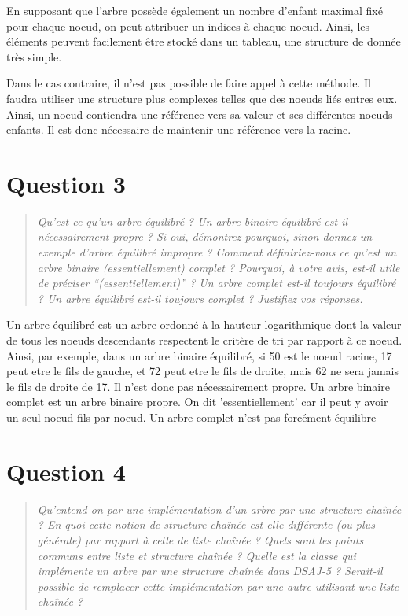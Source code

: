 \documentclass[11pt,a4paper]{article}
\begin{document}
En supposant que l'arbre possède également un nombre d'enfant maximal fixé pour chaque noeud, on peut
attribuer un indices à chaque noeud. Ainsi, les éléments peuvent facilement être stocké dans un tableau,
une structure de donnée très simple.

Dans le cas contraire, il n'est pas possible de faire appel à cette méthode. Il faudra utiliser une structure
plus complexes telles que des noeuds liés entres eux. Ainsi, un noeud contiendra une référence vers sa valeur
et ses différentes noeuds enfants. Il est donc nécessaire de maintenir une référence vers la racine.

\section{Question 3}
\begin{quotation}
\color{gray}\textit{Qu’est-ce qu’un arbre équilibré ? Un arbre binaire équilibré est-il nécessairement
propre ? Si oui, démontrez pourquoi, sinon donnez un exemple d’arbre équilibré
impropre ? Comment définiriez-vous ce qu’est un arbre binaire (essentiellement)
complet ? Pourquoi, à votre avis, est-il utile de préciser “(essentiellement)” ? Un
arbre complet est-il toujours équilibré ? Un arbre équilibré est-il toujours complet ? Justifiez vos réponses.}
\end{quotation}

Un arbre équilibré est un arbre ordonné à la hauteur logarithmique dont la valeur de tous les noeuds descendants respectent le critère
de tri par rapport à ce noeud. Ainsi, par exemple, dans un arbre binaire équilibré,
si 50 est le noeud racine, 17 peut etre le fils de gauche, et 72 peut etre le fils de droite, mais 62 ne sera
jamais le fils de droite de 17. Il n'est donc pas nécessairement propre.
Un arbre binaire complet est un arbre binaire propre. On dit 'essentiellement' car il peut y avoir un seul noeud fils par noeud.
Un arbre complet n'est pas forcément équilibre

\section{Question 4}
\begin{quotation}
\color{gray}\textit{Qu’entend-on par une implémentation d’un arbre par une structure chaînée ? En
quoi cette notion de structure chaînée est-elle différente (ou plus générale) par
rapport à celle de liste chaînée ? Quels sont les points communs entre liste et
structure chaînée ? Quelle est la classe qui implémente un arbre par une structure
chaînée dans DSAJ-5 ? Serait-il possible de remplacer cette implémentation par
une autre utilisant une liste chaînée ?}
\end{quotation}
\end{document}
